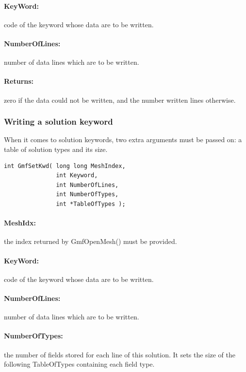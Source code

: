 \documentclass[a4paper,12pt]{article}
\begin{document}
\paragraph{KeyWord:} code of the keyword whose data are to be written.

\paragraph{NumberOfLines:} number of data lines which are to be written.

\paragraph{Returns:} zero if the data could not be written, and the number written lines otherwise.

\subsubsection{Writing a solution keyword}
When it comes to solution keywords, two extra arguments must be passed on: a table of solution types and its size.

\begin{tt}
\begin{verbatim}
int GmfSetKwd( long long MeshIndex,
               int Keyword,
               int NumberOfLines,
               int NumberOfTypes,
               int *TableOfTypes );
\end{verbatim}
\end{tt}
\normalfont

\paragraph{MeshIdx:}
the index returned by GmfOpenMesh() must be provided.

\paragraph{KeyWord:} code of the keyword whose data are to be written.

\paragraph{NumberOfLines:} number of data lines which are to be written.

\paragraph{NumberOfTypes:} the number of fields stored for each line of this solution. It sets the size of the following TableOfTypes containing each field type.
\end{document}
